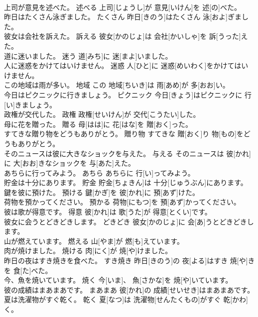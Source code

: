 \documentclass[8pt]{extreport}
\begin{document}
\begin{CJK}{UTF8}{min}
\\	上司が意見を述べた。	述べる	上司[じょうし]が 意見[いけん]を 述[の]べた。	
\\	昨日はたくさん泳ぎました。	たくさん	昨日[きのう]はたくさん 泳[およ]ぎました。	
\\	彼女は会社を訴えた。	訴える	彼女[かのじょ]は 会社[かいしゃ]を 訴[うった]えた。	
\\	道に迷いました。	迷う	道[みち]に 迷[まよ]いました。	
\\	人に迷惑をかけてはいけません。	迷惑	人[ひと]に 迷惑[めいわく]をかけてはいけません。	
\\	この地域は雨が多い。	地域	この 地域[ちいき]は 雨[あめ]が 多[おお]い。	
\\	今日はピクニックに行きましょう。	ピクニック	今日[きょう]はピクニックに 行[い]きましょう。	
\\	政権が交代した。	政権	政権[せいけん]が 交代[こうたい]した。	
\\	母に花を贈った。	贈る	母[はは]に 花[はな]を 贈[おく]った。	
\\	すてきな贈り物をどうもありがとう。	贈り物	すてきな 贈[おく]り 物[もの]をどうもありがとう。	
\\	そのニュースは彼に大きなショックを与えた。	与える	そのニュースは 彼[かれ]に 大[おお]きなショックを 与[あた]えた。	
\\	あちらに行ってみよう。	あちら	あちらに 行[い]ってみよう。	
\\	貯金は十分にあります。	貯金	貯金[ちょきん]は 十分[じゅうぶん]にあります。	
\\	鍵を彼に預けた。	預ける	鍵[かぎ]を 彼[かれ]に 預[あず]けた。	
\\	荷物を預かってください。	預かる	荷物[にもつ]を 預[あず]かってください。	
\\	彼は歌が得意です。	得意	彼[かれ]は 歌[うた]が 得意[とくい]です。	
\\	彼女に会うとどきどきします。	どきどき	彼女[かのじょ]に 会[あ]うとどきどきします。	
\\	山が燃えています。	燃える	山[やま]が 燃[も]えています。	
\\	肉が焼けました。	焼ける	肉[にく]が 焼[や]けました。	
\\	昨日の夜はすき焼きを食べた。	すき焼き	昨日[きのう]の 夜[よる]はすき 焼[や]きを 食[た]べた。	
\\	今、魚を焼いています。	焼く	今[いま]、 魚[さかな]を 焼[や]いています。	
\\	彼の成績はまあまあです。	まあまあ	彼[かれ]の 成績[せいせき]はまあまあです。	
\\	夏は洗濯物がすぐ乾く。	乾く	夏[なつ]は 洗濯物[せんたくもの]がすぐ 乾[かわ]く。	

\end{CJK}
\end{document}
